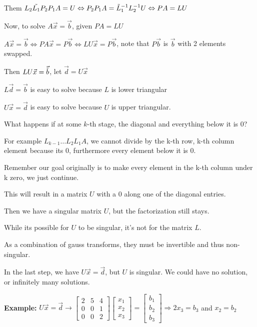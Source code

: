 \documentclass{article}
\begin{document}
\vspace{0.2cm}

Them $L_2 \Tilde{L_1} P_2 P_1 A = U \Leftrightarrow P_2 P_1 A = \Tilde{L}_1^{-1} L_2^{-1} U \Leftrightarrow P A = L U$

\vspace{0.2cm}

Now, to solve $A \vec{x} = \vec{b}$, given $PA = LU$

$A \vec{x} = \vec{b} \Leftrightarrow PA\vec{x} = P\vec{b} \Leftrightarrow LU \vec{x} = P \vec{b}$, note that $P\vec{b}$ is $\vec{b}$ with 2 elements swapped.

Then $LU\vec{x} = \vec{\Tilde{b}}$, let $\vec{d} = U\vec{x}$

$L \vec{d} = \vec{b}$ is easy to solve because $L$ is lower triangular

$U\vec{x} = \vec{d}$ is easy to solve because $U$ is upper triangular. 

\vspace{0.3cm}

What happens if at some $k$-th stage, the diagonal and everything below it is 0?

For example $L_{k - 1} \dots L_2 L_1 A$, we cannot divide by the k-th row, k-th column element because its $0$, furthermore every element below it is $0$. 

Remember our goal originally is to make every element in the k-th column under k zero, we just continue.

\pagebreak

This will result in a matrix $U$ with a $0$ along one of the diagonal entries.

\vspace{0.2cm}

Then we have a singular matrix $U$, but the factorization still stays.

While its possible for $U$ to be singular, it's not for the matrix $L$. 

As a combination of gauss transforms, they must be invertible and thus non-singular.

\vspace{0.2cm}

In the last step, we have $U \vec{x} = \vec{d}$, but $U$ is singular. We could have no solution, or infinitely many solutions.

\textbf{Example: } $U \vec{x} = \vec{d} \to \begin{bmatrix}
2 & 5 & 4\\
0 & 0 & 1\\
0 & 0 & 2
\end{bmatrix} \begin{bmatrix}
x_1\\
x_2\\
x_3
\end{bmatrix} = \begin{bmatrix}
b_1\\
b_2\\
b_3
\end{bmatrix} \Rightarrow 2x_3 = b_3$ and $x_2 = b_2$
\end{document}
